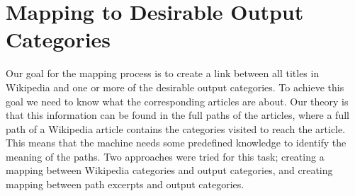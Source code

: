 \section{Mapping to Desirable Output Categories}
Our goal for the mapping process is to create a link between all titles in Wikipedia and one or more of the desirable output categories. To achieve this goal we need to know what the corresponding articles are about. Our theory is that this information can be found in the full paths of the articles, where a 
full path of a Wikipedia article contains the categories visited to reach the article. This means that the  machine needs some predefined knowledge to identify the meaning of the paths. Two approaches were tried for this task; creating a mapping between Wikipedia categories and output categories, and creating mapping between path excerpts and output categories. 





